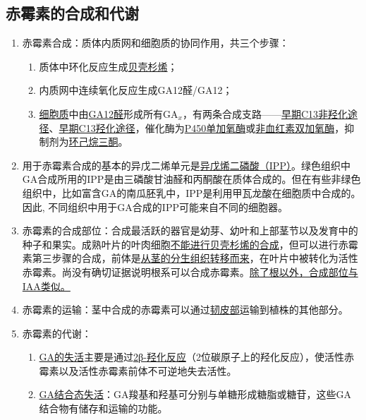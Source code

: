 \subsection{赤霉素的合成和代谢}
\begin{enumerate}
    \item 赤霉素合成：质体内质网和细胞质的协同作用，共三个步骤：
    \begin{enumerate}
        \item 质体中环化反应生成\uline{贝壳杉烯}；
        \item 内质网中连续氧化反应生成GA12醛/GA12；
        \item \uline{细胞质}中由\uline{GA12醛}形成所有GA$_x$，有两条合成支路——\uline{早期C13非羟化途径}、\uline{早期C13羟化途径}，催化酶为\uline{P450单加氧酶}或\uline{非血红素双加氧酶}，抑制剂为\uline{环己烷三酮}。
    \end{enumerate}
    \item 用于赤霉素合成的基本的异戊二烯单元是\uline{异戊烯二磷酸（IPP）}。绿色组织中GA合成所用的IPP是由三磷酸甘油醛和丙酮酸在质体合成的。但在有些非绿色组织中，比如富含GA的南瓜胚乳中，IPP是利用甲瓦龙酸在细胞质中合成的。因此, 不同组织中用于GA合成的IPP可能来自不同的细胞器。
    \item 赤霉素的合成部位：合成最活跃的器官是幼芽、幼叶和上部茎节以及发育中的种子和果实。成熟叶片的叶肉细胞\uline{不能进行贝壳杉烯的合成}，但可以进行赤霉素第三步骤的合成，前体是\uline{从茎的分生组织转移而来}，在叶片中被转化为活性赤霉素。尚没有确切证据说明根系可以合成赤霉素。\uline{除了根以外，合成部位与IAA类似。}
    \item 赤霉素的运输：茎中合成的赤霉素可以通过\uline{韧皮部}运输到植株的其他部分。
    \item 赤霉素的代谢：
    \begin{enumerate}
        \item \uline{GA的失活}主要是通过\uline{2β-羟化反应}（2位碳原子上的羟化反应），使活性赤霉素以及活性赤霉素前体不可逆地失去活性。 
        \item \uline{GA结合态失活}：GA羧基和羟基可分别与单糖形成糖脂或糖苷，这些GA结合物有储存和运输的功能。
    \end{enumerate}
\end{enumerate}
